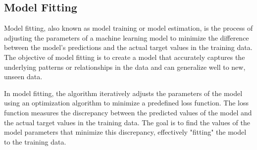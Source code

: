 \documentclass[a4paper]{report}
\begin{document}
\subsection*{Model Fitting}
Model fitting, also known as model training or model estimation, is the process of adjusting the parameters of a machine learning model to minimize the difference between the model's predictions and the actual target values in the training data. The objective of model fitting is to create a model that accurately captures the underlying patterns or relationships in the data and can generalize well to new, unseen data.

In model fitting, the algorithm iteratively adjusts the parameters of the model using an optimization algorithm to minimize a predefined loss function. The loss function measures the discrepancy between the predicted values of the model and the actual target values in the training data. The goal is to find the values of the model parameters that minimize this discrepancy, effectively "fitting" the model to the training data.
\end{document}
